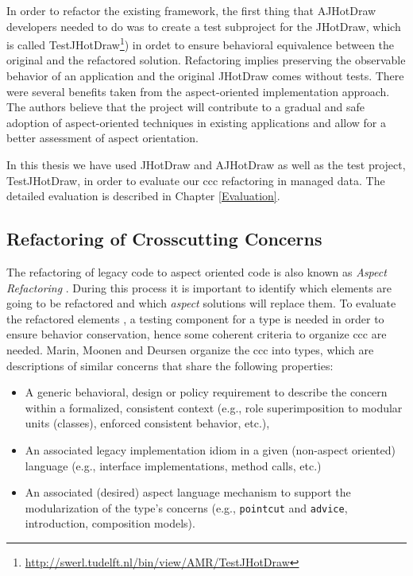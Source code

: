 In order to refactor the existing framework, the first thing that AJHotDraw developers needed to do was to create a test subproject for the JHotDraw, which is called TestJHotDraw\footnote{\url{http://swerl.tudelft.nl/bin/view/AMR/TestJHotDraw}}) in ordet to ensure behavioral equivalence between the original and the refactored solution. 
Refactoring implies preserving the observable behavior of an application\cite{fowler2009refactoring} and the original JHotDraw comes without tests. 
There were several benefits taken from the aspect-oriented implementation approach\cite{marinajhotdraw}. 
The authors believe that the project will contribute to a gradual and safe adoption of aspect-oriented techniques in existing applications and allow for a better assessment of aspect orientation.

In this thesis we have used JHotDraw and AJHotDraw as well as the test project, TestJHotDraw, in order to evaluate our \ac{ccc} refactoring in managed data. 
The detailed evaluation is described in Chapter \ref{Evaluation}.

\subsection{Refactoring of Crosscutting Concerns}\label{Refactoring of ccc}
The refactoring of legacy code to aspect oriented code is also known as \textit{Aspect Refactoring} \cite{marin2005approach}. 
During this process it is important to identify which elements are going to be refactored and which \textit{aspect} solutions will replace them. 
To evaluate the refactored elements \cite{fowler2009refactoring}, a testing component for a type is needed in order to ensure behavior conservation, hence some coherent criteria to organize \ac{ccc} are needed. 
Marin, Moonen and Deursen \cite{marin2005approach} organize the \ac{ccc} into types, which are descriptions of similar concerns that share the following properties: 

\begin{itemize}
	\item A generic behavioral, design or policy requirement to describe the concern within a formalized, consistent context (e.g., role superimposition to modular units (classes), enforced consistent behavior, etc.),

	\item An associated legacy implementation idiom in a given (non-aspect oriented) language (e.g., interface implementations, method calls, etc.)

	\item An associated (desired) aspect language mechanism to support the modularization of the type's concerns (e.g., \texttt{pointcut} and \texttt{advice}, introduction, composition models).
\end{itemize}

